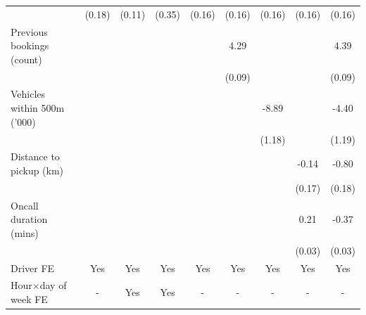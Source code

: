 \documentclass[reviewmode]{restud}
\begin{document}
\begin{landscape}
\begin{table}
{\begin{tabular}{l*{8}{S}}
                                &     (0.18)         &     (0.11)         &     (0.35)         &     (0.16)         &     (0.16)         &     (0.16)         &     (0.16)         &     (0.16)         \\
            \addlinespace
            Previous bookings (count)&                     &                     &                     &                     &       4.29&                     &                     &       4.39\\
                                &                     &                     &                     &                     &     (0.09)         &                     &                     &     (0.09)         \\
            \addlinespace
            Vehicles within 500m ('000)&                     &                     &                     &                     &                     &      -8.89&                     &      -4.40\\
                                &                     &                     &                     &                     &                     &     (1.18)         &                     &     (1.19)         \\
            \addlinespace
            Distance to pickup (km)&                     &                     &                     &                     &                     &                     &      -0.14         &      -0.80\\
                                &                     &                     &                     &                     &                     &                     &     (0.17)         &     (0.18)         \\
            \addlinespace
            Oncall duration (mins)&                     &                     &                     &                     &                     &                     &       0.21&      -0.37\\
                                &                     &                     &                     &                     &                     &                     &     (0.03)         &     (0.03)         \\
            \addlinespace
            Driver FE           &       {Yes}         &       {Yes}         &       {Yes}         &       {Yes}         &       {Yes}         &       {Yes}         &       {Yes}         &       {Yes}         \\
            \addlinespace
            Hour\(\times\)day of week FE&         {-}         &       {Yes}         &       {Yes}         &         {-}         &         {-}         &         {-}         &         {-}         &         {-}         \\

\end{tabular}}
\end{table}
\end{landscape}
\end{document}
